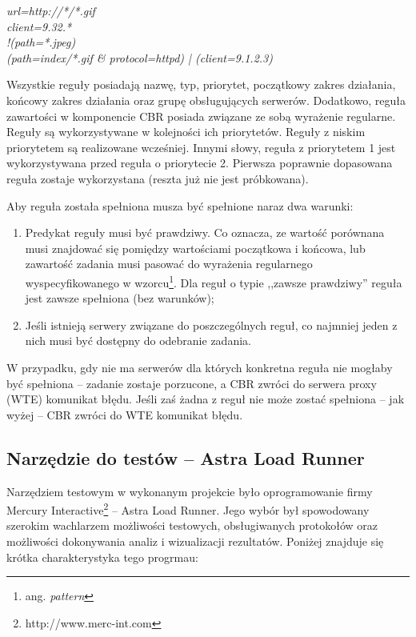 \begin{itemize}
\begin{description}
        \emph{url=http://*/*.gif}\\

        \emph{client=9.32.*}\\

        \emph{!(path=*.jpeg)}\\

        \emph{(path=index/*.gif \& protocol=httpd) | (client=9.1.2.3)}       
        \end{description}
    \end{itemize}

Wszystkie reguły posiadają nazwę, typ, priorytet, początkowy zakres działania, końcowy zakres działania oraz
grupę obsługujących serwerów. Dodatkowo, reguła zawartości w komponencie CBR posiada związane ze sobą
wyrażenie regularne. Reguły są wykorzystywane w kolejności ich priorytetów. Reguły z niskim priorytetem są
realizowane wcześniej. Innymi słowy, reguła z priorytetem 1 jest wykorzystywana przed reguła o priorytecie 2.
Pierwsza poprawnie dopasowana reguła zostaje wykorzystana (reszta już nie jest próbkowana).

Aby reguła została spełniona musza być spełnione naraz dwa warunki:
    \begin{enumerate}
    \item Predykat reguły musi być prawdziwy. Co oznacza, ze wartość porównana musi znajdować się pomiędzy
    wartościami początkowa i końcowa, lub zawartość zadania musi pasować do wyrażenia regularnego
    wyspecyfikowanego w wzorcu\footnote{ang. \emph{pattern}}. Dla reguł o typie ,,zawsze prawdziwy''
    reguła jest zawsze spełniona (bez warunków);
    \item Jeśli istnieją serwery związane do poszczególnych reguł, co najmniej jeden z nich musi być dostępny do
    odebranie zadania.
    \end{enumerate}

W przypadku, gdy nie ma serwerów dla których konkretna reguła nie mogłaby być spełniona -- zadanie zostaje
porzucone, a CBR zwróci do serwera proxy (WTE) komunikat błędu. Jeśli zaś żadna z reguł nie może zostać
spełniona -- jak wyżej -- CBR zwróci do WTE komunikat błędu.

\subsection{Narzędzie do testów -- Astra Load Runner}

Narzędziem testowym w wykonanym projekcie było oprogramowanie firmy Mercury Interactive\footnote{http://www.merc-int.com}
-- Astra Load Runner. Jego wybór był spowodowany szerokim wachlarzem możliwości testowych, obsługiwanych protokołów oraz
możliwości dokonywania analiz i wizualizacji rezultatów. Poniżej znajduje się krótka charakterystyka tego progrmau:

